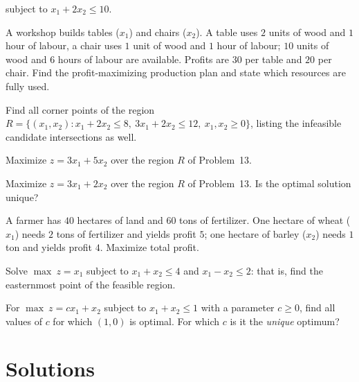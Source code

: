 \begin{problems}
        subject to $x_{1}+2x_{2}\le 10$.
  \item A workshop builds tables ($x_{1}$) and chairs ($x_{2}$). A table
        uses $2$ units of wood and $1$ hour of labour, a chair uses $1$
        unit of wood and $1$ hour of labour; $10$ units of wood and $6$
        hours of labour are available. Profits are $30$ per table and $20$
        per chair. Find the profit-maximizing production plan and state
        which resources are fully used.
  \item Find all corner points of the region
        $R=\{(x_{1},x_{2}):x_{1}+2x_{2}\le 8,\ 3x_{1}+2x_{2}\le 12,\
        x_{1},x_{2}\ge 0\}$, listing the infeasible candidate
        intersections as well.
  \item Maximize $z=3x_{1}+5x_{2}$ over the region $R$ of Problem~13.
  \item Maximize $z=3x_{1}+2x_{2}$ over the region $R$ of Problem~13. Is
        the optimal solution unique?
  \item A farmer has $40$ hectares of land and $60$ tons of fertilizer.
        One hectare of wheat ($x_{1}$) needs $2$ tons of fertilizer and
        yields profit $5$; one hectare of barley ($x_{2}$) needs $1$ ton
        and yields profit $4$. Maximize total profit.
  \item Solve $\max\ z=x_{1}$ subject to $x_{1}+x_{2}\le 4$ and
        $x_{1}-x_{2}\le 2$: that is, find the easternmost point of the
        feasible region.
  \item For $\max\ z=cx_{1}+x_{2}$ subject to $x_{1}+x_{2}\le 1$ with a
        parameter $c\ge 0$, find all values of $c$ for which $(1,0)$ is
        optimal. For which $c$ is it the \emph{unique} optimum?
\end{problems}

\section{Solutions}

